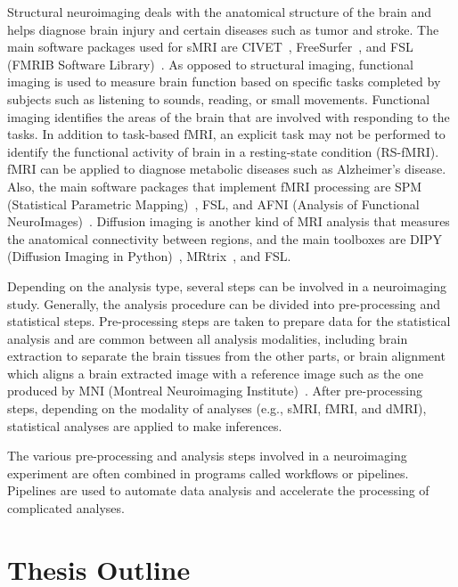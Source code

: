 Structural neuroimaging deals with the anatomical structure of the brain and helps
diagnose brain injury and certain diseases such as tumor and stroke.
The main software packages used for sMRI are 
CIVET~\cite{ad2006civet}, FreeSurfer~\cite{fischl2012freesurfer}, and 
FSL (FMRIB Software Library)~\cite{jenkinson2012fsl}. 
As opposed to structural imaging, functional imaging is used to measure 
brain function based on 
specific tasks completed by subjects such as listening to sounds, 
reading, or small movements. 
Functional imaging identifies the areas of 
the brain that are involved with responding to the tasks. 
In addition to task-based fMRI, an explicit task may not be performed 
to identify the functional activity of brain in a resting-state 
condition (RS-fMRI). fMRI can be applied to 
diagnose metabolic diseases such as Alzheimer's disease. Also, the main 
software packages that implement fMRI processing are SPM (Statistical 
Parametric Mapping)~\cite{spm}, FSL, and AFNI (Analysis of Functional 
NeuroImages)~\cite{cox1996afni}. Diffusion imaging is another kind of 
MRI analysis that measures the anatomical connectivity between 
regions, and the main toolboxes are DIPY (Diffusion Imaging in 
Python)~\cite{garyfallidis2014dipy}, MRtrix~\cite{tournier2012mrtrix}, 
and FSL.

Depending on the analysis type, several steps can be involved in a 
neuroimaging study. Generally, the analysis procedure can be divided into 
pre-processing and statistical steps. Pre-processing steps are taken 
to prepare data for the statistical analysis and are common between all 
analysis modalities, including brain extraction to separate the brain 
tissues from the other parts, or brain alignment which aligns a brain 
extracted image with a reference image such as the one produced by 
MNI (Montreal Neuroimaging Institute)~\cite{evans1992anatomical}. 
After pre-processing steps, depending on the
modality of analyses (e.g., sMRI, fMRI, and dMRI), statistical analyses 
are applied to make inferences.

The various pre-processing and analysis steps involved in a 
neuroimaging experiment are often combined in programs called workflows 
or pipelines. Pipelines are used to automate data analysis and accelerate 
the processing of complicated analyses. 


\section{Thesis Outline}

